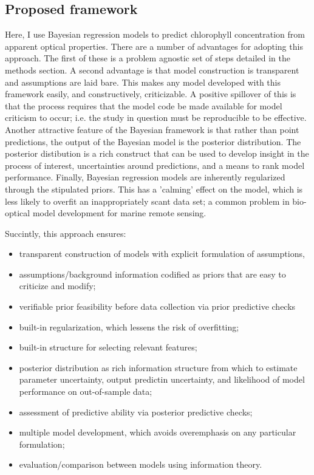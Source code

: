 \documentclass[10pt]{article}
\begin{document}
	\subsection{Proposed framework}
	    Here, I use  Bayesian regression models to predict chlorophyll concentration from apparent optical properties. There are a number of advantages for adopting this approach. The first of these is a problem agnostic set of steps detailed in the methods section. A second advantage is that model construction is transparent and assumptions are laid bare. This makes any model developed with this framework easily, and constructively, criticizable. A positive spillover of this is that the process requires that the model code be made available for model criticism to occur; i.e. the study in question must be reproducible to be effective. Another attractive feature of the Bayesian framework is that rather than point predictions, the output of the Bayesian model is the posterior distribution. The posterior distibution is a rich construct that can be used to develop insight in the process of interest, uncertainties around predictions, and a means to rank model performance. Finally, Bayesian regression models are inherently regularized through the stipulated priors. This has a 'calming' effect on the model, which is less likely to overfit an inappropriately scant data set; a common problem in bio-optical model development for marine remote sensing. 


Succintly, this approach ensures:
	\begin{itemize}
		\item transparent construction of models with explicit formulation of assumptions,
		\item assumptions/background information codified as priors that are easy to criticize and modify;
		\item verifiable prior feasibility before data collection via prior predictive checks
		\item built-in regularization, which lessens the risk of overfitting;
		\item built-in structure for selecting relevant features;
		\item posterior distribution as rich information structure from which to estimate parameter uncertainty, output predictin uncertainty, and likelihood of model performance on out-of-sample data;
		\item assessment of predictive ability via posterior predictive checks;
		\item multiple model development, which avoids overemphasis on any particular formulation;
		\item evaluation/comparison between models using information theory.
	\end{itemize}
\end{document}
